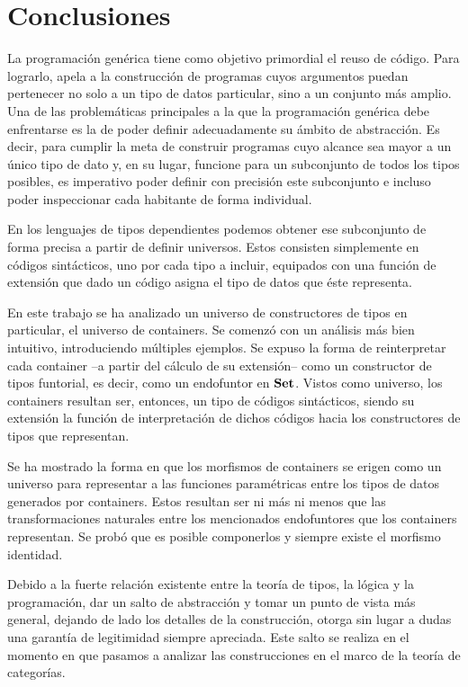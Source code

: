 \chapter*{Conclusiones}

La programación genérica tiene como objetivo primordial el reuso de código. Para lograrlo, apela a la construcción de programas cuyos argumentos puedan pertenecer no solo a un tipo de datos particular, sino a un conjunto más amplio.   
Una de las problemáticas principales a la que la programación genérica debe enfrentarse es la de poder definir adecuadamente su ámbito de abstracción. Es decir, para cumplir la meta de construir programas cuyo alcance sea mayor a un único tipo de dato y, en su lugar, funcione para un subconjunto de todos los tipos posibles, es imperativo poder definir con precisión este subconjunto e incluso poder inspeccionar cada habitante de forma individual.

En los lenguajes de tipos dependientes podemos obtener ese subconjunto de forma precisa a partir de definir universos. Estos consisten simplemente en códigos sintácticos, uno por cada tipo a incluir, equipados con una función de extensión que dado un código asigna el tipo de datos que éste representa.

En este trabajo se ha analizado un universo de constructores de tipos en particular, el universo de containers. Se comenzó con un análisis más bien intuitivo, introduciendo múltiples ejemplos. Se expuso la forma de reinterpretar cada container --a partir del cálculo de su extensión-- como un constructor de tipos funtorial, es decir, como un endofuntor en $\mathbf{Set}$. Vistos como universo, los containers resultan ser, entonces, un tipo de códigos sintácticos, siendo su extensión la función de interpretación de dichos códigos hacia los constructores de tipos que representan.  

Se ha mostrado la forma en que los morfismos de containers se erigen como un universo para representar a las funciones paramétricas entre los tipos de datos generados por containers. Estos resultan ser ni más ni menos que las transformaciones naturales entre los mencionados endofuntores que los containers representan. Se probó que es posible componerlos y siempre existe el morfismo identidad.

Debido a la fuerte relación existente entre la teoría de tipos, la lógica y la programación, dar un salto de abstracción y tomar un punto de vista más general, dejando de lado los detalles de la construcción, otorga sin lugar a dudas una garantía de legitimidad siempre apreciada. Este salto se realiza en el momento en que pasamos a analizar las construcciones en el marco de la teoría de categorías.

